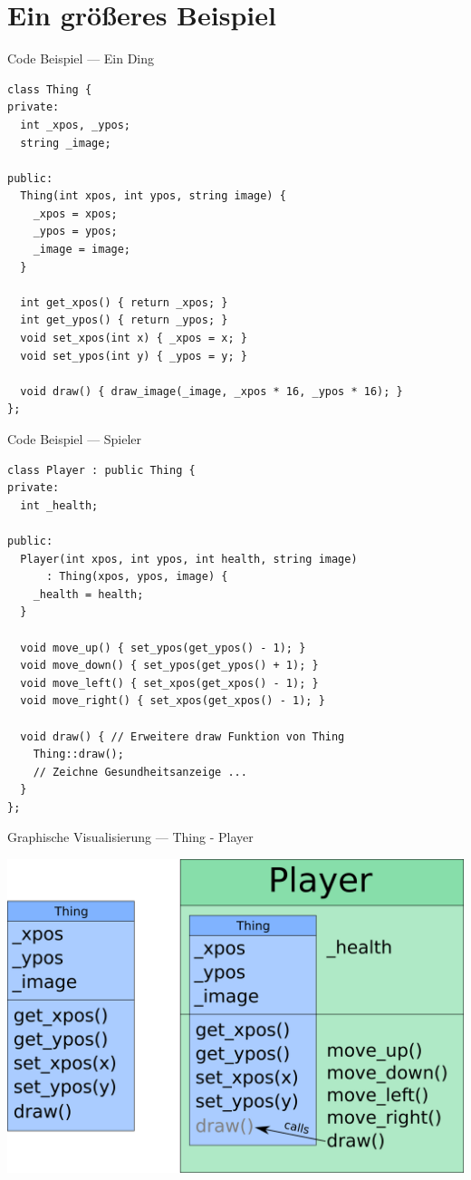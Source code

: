 \documentclass[presentation]{beamer}
\begin{document}
\section{Ein größeres Beispiel}
\label{sec:orgbd756be}
\begin{frame}[fragile,label={sec:org12396fe}]{Code Beispiel --- Ein Ding}
 \begin{verbatim}
class Thing {
private:
  int _xpos, _ypos;
  string _image;

public:
  Thing(int xpos, int ypos, string image) {
    _xpos = xpos;
    _ypos = ypos;
    _image = image;
  }

  int get_xpos() { return _xpos; }
  int get_ypos() { return _ypos; }
  void set_xpos(int x) { _xpos = x; }
  void set_ypos(int y) { _ypos = y; }

  void draw() { draw_image(_image, _xpos * 16, _ypos * 16); }
};
\end{verbatim}
\end{frame}
\begin{frame}[fragile,label={sec:orgeccb450}]{Code Beispiel --- Spieler}
 \begin{verbatim}
class Player : public Thing {
private:
  int _health;

public:
  Player(int xpos, int ypos, int health, string image)
      : Thing(xpos, ypos, image) {
    _health = health;
  }

  void move_up() { set_ypos(get_ypos() - 1); }
  void move_down() { set_ypos(get_ypos() + 1); }
  void move_left() { set_xpos(get_xpos() - 1); }
  void move_right() { set_xpos(get_xpos() - 1); }

  void draw() { // Erweitere draw Funktion von Thing
    Thing::draw();
    // Zeichne Gesundheitsanzeige ...
  }
};
\end{verbatim}
\end{frame}
\begin{frame}[label={sec:orgf8bd58e}]{Graphische Visualisierung --- Thing - Player}
\begin{center}\begin{center}
\includegraphics[width=.9\linewidth]{imgs/thingplayer.png}
\end{center}\end{center}
\end{frame}
\end{document}
